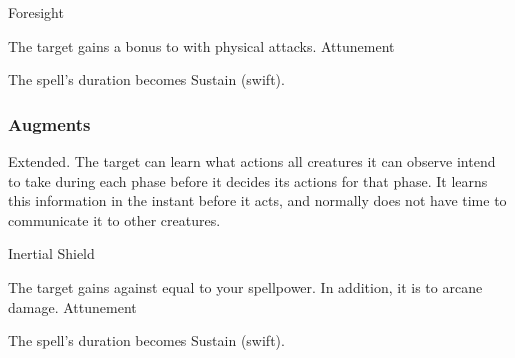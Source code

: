 \begin{spellsection}{Foresight}
\begin{spellheader}
\end{spellheader}
\begin{spellcontent}
\begin{spelltargetinginfo}
\end{spelltargetinginfo}
\begin{spelleffects}
\spelleffect
The target gains a  bonus to  with physical attacks.
\spelldur Attunement
\end{spelleffects}
\end{spellcontent}
\begin{spellfooter}
\miscastexplode
\end{spellfooter}
\begin{spellcantrip}
The spell's duration becomes Sustain (swift).
\end{spellcantrip}
\end{spellsection}
\subsubsection{Augments}
 Extended.
The target can learn what actions all creatures it can observe intend to take during each phase before it decides its actions for that phase.
It learns this information in the instant before it acts, and normally does not have time to communicate it to other creatures.
\begin{spellsection}{Inertial Shield}
\begin{spellheader}
\end{spellheader}
\begin{spellcontent}
\begin{spelltargetinginfo}
\end{spelltargetinginfo}
\begin{spelleffects}
\spelleffect
The target gains  against  equal to your spellpower.
In addition, it is  to arcane damage.
\spelldur Attunement
\end{spelleffects}
\end{spellcontent}
\begin{spellfooter}
\miscastexplode
\end{spellfooter}
\begin{spellcantrip}
The spell's duration becomes Sustain (swift).
\end{spellcantrip}
\end{spellsection}
